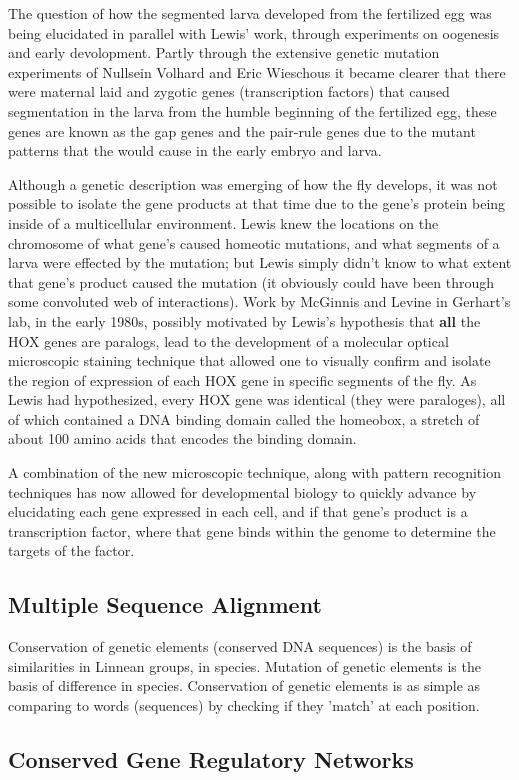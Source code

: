 The question of how the segmented larva developed from the fertilized egg was being elucidated in parallel with Lewis' work, through experiments on oogenesis and early devolopment.  Partly through the extensive genetic mutation experiments of Nullsein Volhard and Eric Wieschous it became clearer that there were maternal laid and zygotic genes (transcription factors) that caused segmentation in the larva from the humble beginning of the fertilized egg, these genes are known as the gap genes and the pair-rule genes due to the mutant patterns that the would cause in the early embryo and larva.  

Although a genetic description was emerging of how the fly develops, it was not possible to isolate the gene products at that time due to the gene's protein being inside of a multicellular environment.  Lewis knew the locations on the chromosome of what gene's caused homeotic mutations, and what segments of a larva were effected by the mutation; but Lewis simply didn't know to what extent that gene's product caused the mutation (it obviously could have been through some convoluted web of interactions).  Work by McGinnis and Levine in Gerhart's lab, in the early 1980s, possibly motivated by Lewis's hypothesis that \textbf{all} the HOX genes are paralogs, lead to the development of a molecular optical microscopic staining technique that allowed one to visually confirm and isolate the region of expression of each HOX gene in specific segments of the fly.  As Lewis had hypothesized, every HOX gene was identical (they were paraloges), all of which contained a DNA binding domain called the homeobox, a stretch of about 100 amino acids that encodes the binding domain.

A combination of the new microscopic technique, along with pattern recognition techniques has now allowed for developmental biology to quickly advance by elucidating each gene expressed in each cell, and if that gene's product is a transcription factor, where that gene binds within the genome to determine the targets of the factor.  


\subsection{Multiple Sequence Alignment}
Conservation of genetic elements (conserved DNA sequences) is the basis of similarities in Linnean groups, in species.  Mutation of genetic elements is the basis of difference in species.  Conservation of genetic elements is as simple as comparing to words (sequences) by checking if they 'match' at each position.


 



  
\subsection{Conserved Gene Regulatory Networks}